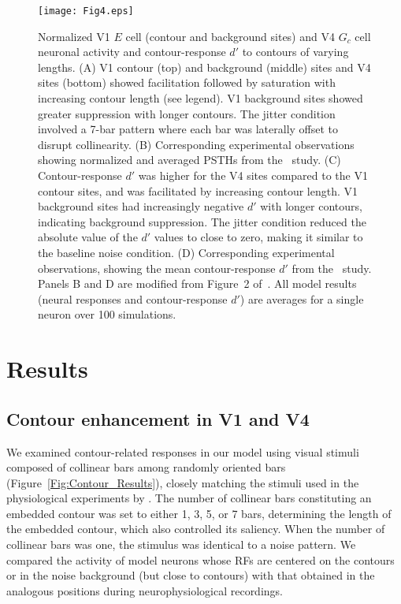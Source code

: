 {\begin{figure}
\begin{center}
\texttt{[image: Fig4.eps]}
\end{center}
\caption{Normalized V1 $E$ cell (contour and background sites) and V4
  $G_c$ cell neuronal activity and contour-response $d'$ to contours of
  varying lengths. (A) V1 contour (top) and background (middle) sites
  and V4 sites (bottom) showed facilitation followed by saturation
  with increasing contour length (see legend). V1 background sites
  showed greater suppression with longer contours. The jitter
  condition involved a 7-bar pattern where each bar was laterally
  offset to disrupt collinearity. (B) Corresponding experimental
  observations showing normalized and averaged PSTHs from
  the~\cite{Chen_etal14} study. 
  (C) Contour-response $d'$ was higher for the V4
  sites compared to the V1 contour sites, and was facilitated by
  increasing contour length. V1 background sites had increasingly
  negative $d'$ with longer contours, indicating background
  suppression. The jitter condition reduced the absolute value of the
  $d'$ values to close to zero, making it similar to the baseline
  noise condition. (D) Corresponding experimental observations,
  showing the mean contour-response $d'$ from the~\cite{Chen_etal14}
  study. 
  Panels B and D are modified from Figure~2 of~\cite{Chen_etal14}.
  All model results (neural responses and contour-response $d'$) are
  averages for a single neuron over 100 simulations.
}
\label{Fig:Neural_responses}
\end{figure}

\section{Results}
\label{sec:results}
\subsection{Contour enhancement in V1 and V4}
We examined contour-related responses in our model using visual
stimuli composed of collinear bars among randomly oriented bars
(Figure~\ref{Fig:Contour_Results}), closely matching the stimuli used
in the physiological experiments by \cite{Chen_etal14}. The number of
collinear bars constituting an embedded contour
was set to either 1, 3, 5, or 7 bars, 
determining the length
of the embedded contour, 
which also controlled its saliency.
When the number of collinear bars was one, the stimulus was identical to a
noise pattern. We compared the activity of model neurons
whose RFs are centered on the contours 
or in the noise background (but close to contours)
with that obtained in the analogous positions during
neurophysiological recordings.

}
